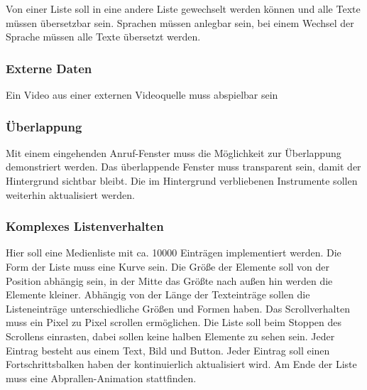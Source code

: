 Von einer Liste soll in eine andere Liste gewechselt werden können und alle Texte müssen übersetzbar sein. Sprachen müssen anlegbar sein, bei einem Wechsel der Sprache müssen alle Texte übersetzt werden.

\subsubsection{Externe Daten}
Ein Video aus einer externen Videoquelle muss abspielbar sein

\subsubsection{Überlappung}
Mit einem eingehenden Anruf-Fenster muss die Möglichkeit zur Überlappung demonstriert werden. Das überlappende Fenster muss transparent sein, damit der Hintergrund sichtbar bleibt. Die im Hintergrund verbliebenen Instrumente sollen weiterhin aktualisiert werden.

\subsubsection{Komplexes Listenverhalten}
Hier soll eine Medienliste mit ca. 10000 Einträgen implementiert werden. Die Form der Liste muss eine Kurve sein. Die Größe der Elemente soll von der Position abhängig sein, in der Mitte das Größte nach außen hin werden die Elemente kleiner. Abhängig von der Länge der Texteinträge sollen die Listeneinträge unterschiedliche Größen und Formen haben. Das Scrollverhalten muss ein Pixel zu Pixel scrollen ermöglichen. Die Liste soll beim Stoppen des Scrollens einrasten, dabei sollen keine halben Elemente zu sehen sein. Jeder Eintrag besteht aus einem Text, Bild und Button. Jeder Eintrag soll einen Fortschrittsbalken haben der kontinuierlich aktualisiert wird. Am Ende der Liste muss eine Abprallen-Animation stattfinden.

